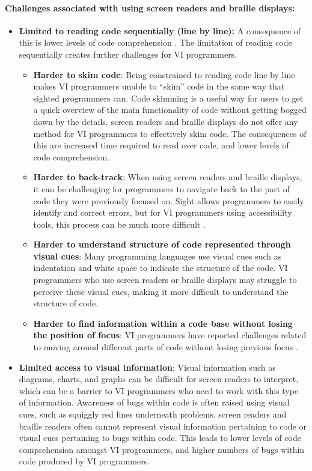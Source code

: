 \documentclass{l4proj}
\begin{document}
\paragraph{Challenges associated with using screen readers and braille displays:}
\begin{itemize}
\item \textbf{Limited to reading code sequentially (line by line):}  \cite{code_mirror_block_2019} A consequence of this is lower levels of code comprehension \cite{ Mountapmbeme_Okafor_Ludi_2022}. The limitation of reading code sequentially creates further challenges for VI programmers. 
\begin{itemize}
\item  \textbf{Harder to skim code}: Being constrained to reading code line by line makes VI programmers unable to “skim” code in the same way that sighted programmers can. Code skimming is a useful way for users to get a quick overview of the main functionality of code without getting bogged down by the details. screen readers and braille displays do not offer any method for VI programmers to effectively skim code. The consequences of this are increased time required to read over code, and lower levels of code comprehension. \cite{structujumper_2015}
\item \textbf{Harder to back-track}: When using screen readers and braille displays, it can be challenging for programmers to navigate back to the part of code they were previously focused on. Sight allows programmers to easily identify and correct errors, but for VI programmers using accessibility tools, this process can be much more difficult \cite{Javaspeak_2000}.
\item \textbf{Harder to understand structure of code represented through visual cues}: Many programming languages use visual cues such as indentation and white space to indicate the structure of the code. VI programmers who use screen readers or braille displays may struggle to perceive these visual cues, making it more difficult to understand the structure of code. \cite{code_mirror_block_2019} 
\item \textbf{Harder to find information within a code base without losing the position of focus}: VI programmers have reported challenges related to moving around different parts of code without losing previous focus \cite{ Albusays_Ludi_2016}. 
	\end{itemize}

\item \textbf{Limited access to visual information}: Visual information such as diagrams, charts, and graphs can be difficult for screen readers to interpret, which can be a barrier to VI programmers who need to work with this type of information. Awareness of bugs within code is often raised using visual cues, such as squiggly red lines underneath problems. screen readers and braille readers often cannot represent visual information pertaining to code or visual cues pertaining to bugs within code. This leads to lower levels of code comprehension amongst VI programmers, and higher numbers of bugs within code produced by VI programmers. 


\end{itemize}
\end{document}
